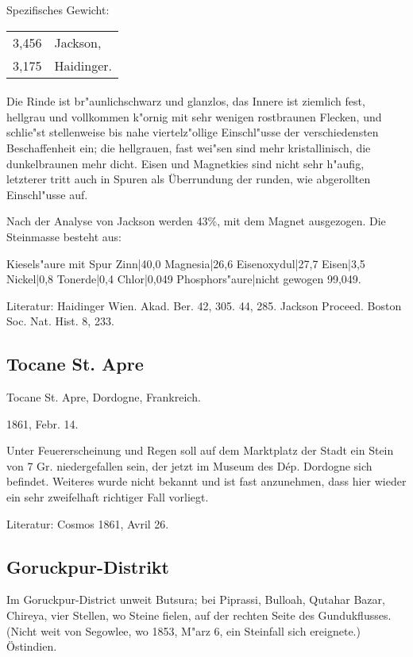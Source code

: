 \documentclass[a4paper, 11pt, oneside]{article}
\begin{document}
Spezifisches Gewicht:  
\begin{table}[!ht]
    \centering
    \begin{tabular}{l l}
        3,456 & Jackson,\\
        3,175 & Haidinger.
    \end{tabular}
\end{table}
\paragraph{}
Die Rinde ist br"aunlichschwarz und glanzlos, das Innere ist ziemlich fest, hellgrau und vollkommen k"ornig mit sehr wenigen rostbraunen Flecken, und schlie"st stellenweise bis nahe viertelz"ollige Einschl"usse der verschiedensten Beschaffenheit ein; die hellgrauen, fast wei"sen sind mehr kristallinisch, die dunkelbraunen mehr dicht. Eisen und Magnetkies sind nicht sehr h"aufig, letzterer tritt auch in Spuren als Überrundung der runden, wie abgerollten Einschl"usse auf.

Nach der Analyse von Jackson werden 43\%, mit dem Magnet ausgezogen. Die Steinmasse besteht aus:

Kiesels"aure mit Spur Zinn|40,0  
Magnesia|26,6  
Eisenoxydul|27,7  
Eisen|3,5  
Nickel|0,8  
Tonerde|0,4  
Chlor|0,049  
Phosphors"aure|nicht gewogen  
99,049.

Literatur: Haidinger Wien. Akad. Ber. 42, 305. 44, 285. Jackson Proceed. Boston Soc. Nat. Hist. 8, 233.

\subsection{Tocane St. Apre}

Tocane St. Apre, Dordogne, Frankreich.

1861, Febr. 14.

Unter Feuererscheinung und Regen soll auf dem Marktplatz der Stadt ein Stein von 7 Gr. niedergefallen sein, der jetzt im Museum des Dép. Dordogne sich befindet. Weiteres wurde nicht bekannt und ist fast anzunehmen, dass hier wieder ein sehr zweifelhaft richtiger Fall vorliegt.

Literatur: Cosmos 1861, Avril 26.

\subsection{Goruckpur-Distrikt}

Im Goruckpur-District unweit Butsura; bei Piprassi, Bulloah, Qutahar Bazar, Chireya, vier Stellen, wo Steine fielen, auf der rechten Seite des Gundukflusses. (Nicht weit von Segowlee, wo 1853, M"arz 6, ein Steinfall sich ereignete.) Östindien.
\end{document}
